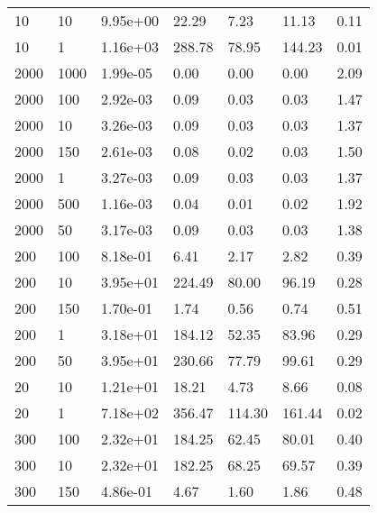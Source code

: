 \begin{table}
\begin{tabular}{lllllll}
10        &   10        &   9.95e+00  &   22.29     &   7.23      &   11.13     &   0.11      \\ 
10        &   1         &   1.16e+03  &   288.78    &   78.95     &   144.23    &   0.01      \\ 
2000      &   1000      &   1.99e-05  &   0.00      &   0.00      &   0.00      &   2.09      \\ 
2000      &   100       &   2.92e-03  &   0.09      &   0.03      &   0.03      &   1.47      \\ 
2000      &   10        &   3.26e-03  &   0.09      &   0.03      &   0.03      &   1.37      \\ 
2000      &   150       &   2.61e-03  &   0.08      &   0.02      &   0.03      &   1.50      \\ 
2000      &   1         &   3.27e-03  &   0.09      &   0.03      &   0.03      &   1.37      \\ 
2000      &   500       &   1.16e-03  &   0.04      &   0.01      &   0.02      &   1.92      \\ 
2000      &   50        &   3.17e-03  &   0.09      &   0.03      &   0.03      &   1.38      \\ 
200       &   100       &   8.18e-01  &   6.41      &   2.17      &   2.82      &   0.39      \\ 
200       &   10        &   3.95e+01  &   224.49    &   80.00     &   96.19     &   0.28      \\ 
200       &   150       &   1.70e-01  &   1.74      &   0.56      &   0.74      &   0.51      \\ 
200       &   1         &   3.18e+01  &   184.12    &   52.35     &   83.96     &   0.29      \\ 
200       &   50        &   3.95e+01  &   230.66    &   77.79     &   99.61     &   0.29      \\ 
20        &   10        &   1.21e+01  &   18.21     &   4.73      &   8.66      &   0.08      \\ 
20        &   1         &   7.18e+02  &   356.47    &   114.30    &   161.44    &   0.02      \\ 
300       &   100       &   2.32e+01  &   184.25    &   62.45     &   80.01     &   0.40      \\ 
300       &   10        &   2.32e+01  &   182.25    &   68.25     &   69.57     &   0.39      \\ 
300       &   150       &   4.86e-01  &   4.67      &   1.60      &   1.86      &   0.48      \\ 

\end{tabular}
\end{table}
